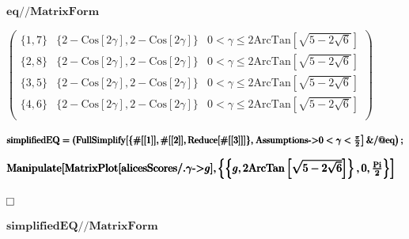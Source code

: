 \documentclass{article}
\begin{document}
\begin{doublespace}
\noindent\(\pmb{\text{eq}\text{//}\text{MatrixForm}}\)
\end{doublespace}

\begin{doublespace}
\noindent\(\left(
\begin{array}{ccc}
 \{1,7\} & \{2-\text{Cos}[2 \gamma ],2-\text{Cos}[2 \gamma ]\} & 0<\gamma \leq 2 \text{ArcTan}\left[\sqrt{5-2 \sqrt{6}}\right] \\
 \{2,8\} & \{2-\text{Cos}[2 \gamma ],2-\text{Cos}[2 \gamma ]\} & 0<\gamma \leq 2 \text{ArcTan}\left[\sqrt{5-2 \sqrt{6}}\right] \\
 \{3,5\} & \{2-\text{Cos}[2 \gamma ],2-\text{Cos}[2 \gamma ]\} & 0<\gamma \leq 2 \text{ArcTan}\left[\sqrt{5-2 \sqrt{6}}\right] \\
 \{4,6\} & \{2-\text{Cos}[2 \gamma ],2-\text{Cos}[2 \gamma ]\} & 0<\gamma \leq 2 \text{ArcTan}\left[\sqrt{5-2 \sqrt{6}}\right] \\
\end{array}
\right)\)
\end{doublespace}

\begin{doublespace}
\noindent\(\pmb{\text{simplifiedEQ}= }\\
\pmb{(\text{FullSimplify}[\{\#[[1]],\#[[2]],\text{Reduce}[\#[[3]]]\},}\\
\pmb{\left.\left.\text{Assumptions}\text{-$>$}0<\gamma <\frac{\pi }{2}\right]\&\text{/@}\text{eq}\right);}\)
\end{doublespace}

\begin{doublespace}
\noindent\(\pmb{\text{Manipulate}[\text{MatrixPlot}[\text{alicesScores}\text{/.}\gamma \text{-$>$}g],}\\
\pmb{\left.\left\{\left\{g,2 \text{ArcTan}\left[\sqrt{5-2 \sqrt{6}}\right]\right\},0,\frac{\text{Pi}}{2}\right\}\right]}\)
\end{doublespace}

\begin{doublespace}
\noindent\(\fbox{$$}\)
\end{doublespace}

\begin{doublespace}
\noindent\(\pmb{\text{simplifiedEQ}\text{//}\text{MatrixForm}}\)
\end{doublespace}
\end{document}
